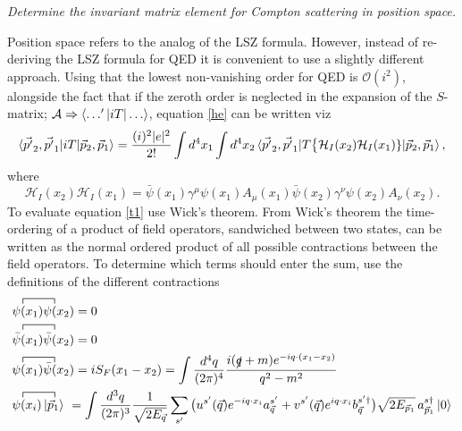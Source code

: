 \begin{example}
	\emph{Determine the invariant matrix element for Compton scattering in position space.}\newline
	
	Position space refers to the analog of the LSZ formula. However, instead of re-deriving the LSZ formula for QED it is convenient to use a slightly different approach. Using that the lowest non-vanishing order for QED is $\mathcal{O}(i^2)$, alongside the fact that if the zeroth order is neglected in the expansion of the $S$-matrix; $\mathcal{A}\Rightarrow \braket{\dots'|iT|\dots}$, equation \eqref{he} can be written viz
	\begin{equation}
		\begin{split}
			\braket{\vec{p'}_2,\vec{p'}_1|iT|\vec{p}_2, \vec{p}_1}&=\frac{(i)^2|e|^2}{2!}\int d^4x_1\int d^4 x_2\braket{\vec{p'}_2,\vec{p'}_1|T\big\{\mathcal{H}_I(x_2)\mathcal{H}_I(x_1)\}|\vec{p}_2,\vec{p}_1},\\
		\end{split}
		\label{t1}
	\end{equation} 
	where
	\begin{equation}
		\mathcal{H}_I(x_2)\mathcal{H}_I(x_1)=\bar{\psi}(x_1)\gamma^\mu\psi(x_1)A_\mu(x_1)\bar{\psi}(x_2)\gamma^\nu\psi(x_2)A_\nu(x_2).
	\end{equation} 
	To evaluate equation \ref{t1} use Wick's theorem. From Wick's theorem the time-ordering of a product of field operators, sandwiched between two states, can be written as the normal ordered product of all possible contractions between the field operators. To determine which terms should enter the sum, use the definitions of the different contractions
	\begin{equation}
		\begin{split}
			&\contraction{0}{\psi}{(x_1)}{\psi}
			\psi(x_1)\psi(x_2)=0 \\
			&\contraction{0}{\bar{\psi}}{(x_1)}{\bar{\psi}}
			\bar{\psi}(x_1)\bar{\psi}(x_2)=0\\
			&\contraction{0}{\psi}{(x_1)}{\bar{\psi}}
			\psi(x_1)\bar{\psi}(x_2)=iS_F(x_1-x_2)=\int\frac{d^4q}{(2\pi)^4}\frac{i(\slashed q+m)e^{-iq\cdot(x_1-x_2)}}{q^2-m^2}\\
			&\contraction{0}{\psi}{(x_i)}{\vec{p}_1}
			\psi(x_i)\ket{\vec{p}_1}\,\,=\int\frac{d^3q}{(2\pi)^3}\frac{1}{\sqrt{2E_{\vec{q}}}}\sum_{s'}\big(u^{s'}(\vec{q})e^{-iq\cdot x_i}a^{s'}_{\vec{q}}+v^{s'}(\vec{q})e^{iq\cdot x_i}b^{s'\dagger}_{\vec{q}}\big)\sqrt{2E_{\vec{p}_1}}\,a^{s\dagger}_{\vec{p}_1}\ket{0}\\

\end{split}
\end{equation}
\end{example}
